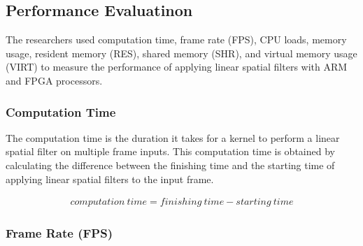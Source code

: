 \subsection{Performance Evaluatinon}

The researchers used computation time, frame rate (FPS), CPU loads, memory usage, resident memory (RES), shared memory (SHR), and virtual memory usage (VIRT) to measure the performance of applying linear spatial filters with ARM and FPGA processors.

\subsubsection{Computation Time}

The computation time is the duration it takes for a kernel to perform a linear spatial filter on multiple frame inputs. This computation time is obtained by calculating the difference between the finishing time and the starting time of applying linear spatial filters to the input frame.

\begin{equation}
    \label{eq:time}
    \begin{split}
computation\ time = finishing\ time - starting\ time
    \end{split}
\end{equation}

\subsubsection{Frame Rate (FPS)}

